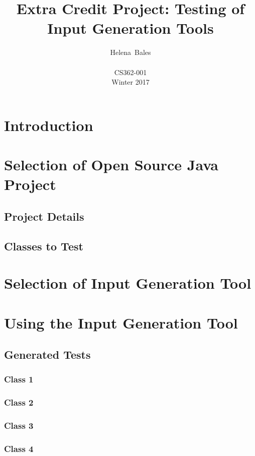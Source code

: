 \documentclass[letterpaper,10pt]{article}
\title{Extra Credit Project: Testing of Input Generation Tools}
\author{Helena~Bales\\ \\ CS362-001 \\ Winter 2017}
\begin{document}
\maketitle

\clearpage
\tableofcontents
\clearpage

\section{Introduction}

\section{Selection of Open Source Java Project}
	\subsection{Project Details}
	\subsection{Classes to Test}

\section{Selection of Input Generation Tool}

\section{Using the Input Generation Tool}
	\subsection{Generated Tests}
		\subsubsection{Class 1}
		

		\subsubsection{Class 2}
		

		\subsubsection{Class 3}
		

		\subsubsection{Class 4}
		
\end{document}
